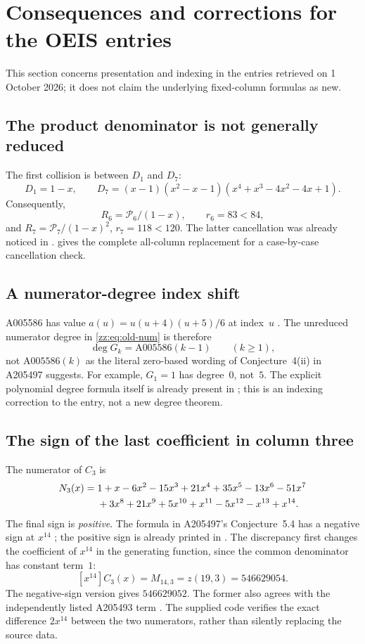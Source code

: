 \documentclass[11pt,a4paper]{article}
\theoremstyle{definition}
\begin{document}
\section{Consequences and corrections for the OEIS entries}
\label{zz:sec:oeis}
This section concerns presentation and indexing in the entries retrieved on
1 October 2026; it does not claim the underlying fixed-column formulas as new.

\subsection{The product denominator is not generally reduced}
The first collision is between $D_1$ and $D_7$:
\[
 D_1=1-x,\qquad
 D_7=(x-1)(x^2-x-1)(x^4+x^3-4x^2-4x+1).
\]
Consequently,
\[
 R_6=\mathcal P_6/(1-x),\qquad r_6=83<84,
\]
and
$R_7=\mathcal P_7/(1-x)^2$, $r_7=118<120$.
The latter cancellation was already noticed in \cite[Remark~5.7]{xz}.
 gives the complete all-column replacement for a
case-by-case cancellation check.

\subsection{A numerator-degree index shift}
A005586 has value $a(u)=u(u+4)(u+5)/6$ at index~$u$ \cite{oeis5586}.
The unreduced numerator degree in \eqref{zz:eq:old-num} is therefore
\[
 \deg G_k=\mathrm{A005586}(k-1)\qquad(k\ge1),
\]
not $\mathrm{A005586}(k)$ as the literal zero-based wording of Conjecture~4(ii)
in A205497 suggests.  For example, $G_1=1$ has degree~$0$, not~$5$.
The explicit polynomial degree formula itself is already present in
\cite{xz}; this is an indexing correction to the entry, not a new degree theorem.

\subsection{The sign of the last coefficient in column three}
The numerator of $C_3$ is
\begin{align}\label{zz:eq:N3}
 N_3(x)={}&1+x-6x^2-15x^3+21x^4+35x^5-13x^6-51x^7\notag\\
 &+3x^8+21x^9+5x^{10}+x^{11}-5x^{12}-x^{13}+x^{14}.
\end{align}
The final sign is \emph{positive}.  The formula in A205497's Conjecture~5.4
has a negative sign at $x^{14}$ \cite{oeis205497}; the positive sign is already
printed in \cite[Example~5.11]{xz}.
The discrepancy first changes the coefficient of $x^{14}$ in the generating
function, since the common denominator has constant term~$1$:
\[
 [x^{14}]C_3(x)=M_{14,3}=z(19,3)=546629054.
\]
The negative-sign version gives $546629052$.  The former also agrees with
the independently listed A205493 term \cite{oeis205493}.
The supplied code verifies the exact difference $2x^{14}$ between the two
numerators, rather than silently replacing the source data.
\end{document}
